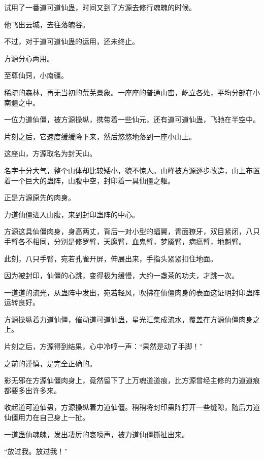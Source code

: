 
\begin{this_body}



试用了一番道可道仙蛊，时间又到了方源去修行魂魄的时候。

他飞出云城，去往落魄谷。

不过，对于道可道仙蛊的运用，还未终止。

方源分心两用。

至尊仙窍，小南疆。

稀疏的森林，再无当初的荒芜景象。一座座的普通山峦，屹立各处，平均分部在小南疆之中。

一位力道仙僵，被方源操纵，携带着一些仙元，还有道可道仙蛊，飞驰在半空中。

片刻之后，它速度缓缓降下来，然后悠悠地落到一座小山上。

这座山，方源取名为封天山。

名字十分大气，整个山体却比较矮小，貌不惊人。山峰被方源逐步改造，山上布置着一个巨大的蛊阵，山腹中空，封印着一具仙僵之躯。

正是方源原先的肉身。

力道仙僵进入山腹，来到封印蛊阵的中心。

方源这具仙僵肉身，身高两丈，背后一对小型的蝠翼，青面獠牙，双目紧闭，八只手臂各不相同，分别是修罗臂，天魔臂，血鬼臂，梦魇臂，病瘟臂，地魁臂。

此刻，八只手臂，宛若孔雀开屏，伸展出来，手指头紧紧扣住地面。

因为被封印，仙僵的心跳，变得极为缓慢，大约一盏茶的功夫，才跳一次。

一道道的流光，从蛊阵中发出，宛若轻风，吹拂在仙僵肉身的表面这证明封印蛊阵运转良好。

方源操纵着力道仙僵，催动道可道仙蛊，星光汇集成流水，覆盖在方源仙僵肉身之上。

片刻之后，方源得到结果，心中冷哼一声：“果然是动了手脚！”

之前的谨慎，是完全正确的。

影无邪在方源仙僵肉身上，竟然留下了上万魂道道痕，比方源曾经主修的力道道痕都要多出许多来。

收起道可道仙蛊，方源操纵着力道仙僵。稍稍将封印蛊阵打开一些缝隙，随后力道仙僵用力在自己身上一扯。

一道蛊仙魂魄，发出凄厉的哀嚎声，被力道仙僵撕扯出来。

“放过我。放过我！”


\end{this_body}
